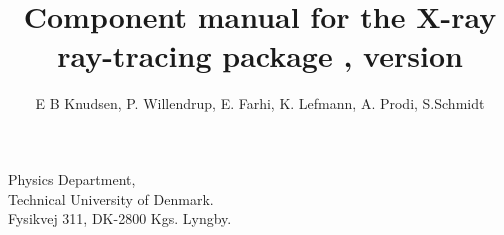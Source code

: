 \title{Component manual for the X-ray ray-tracing package \MCX, version \version}

\author{E B Knudsen, P. Willendrup, E. Farhi, K. Lefmann, A. Prodi, S.Schmidt}

\date{\releasedate}

Physics Department,\\
Technical University of Denmark.\\

Fysikvej 311, DK-2800 Kgs. Lyngby.

